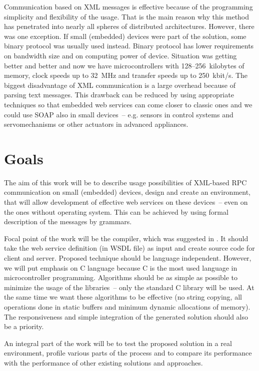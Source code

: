 \documentclass[12pt,notitlepage]{report}
\begin{document}
Communication based on XML messages is effective because of the programming simplicity and flexibility of the usage. That is the main reason why this method has penetrated into nearly all spheres of distributed architectures. However, there was one exception. If small (embedded) devices were part of the solution, some binary protocol was usually used instead. Binary protocol has lower requirements on bandwidth size and on computing power of device. Situation was getting better and better and now we have microcontrollers with 128--256~kilobytes of memory, clock speeds up to 32~MHz and transfer speeds up to 250~kbit/s. The biggest disadvantage of XML communication is a large overhead because of parsing text messages. This drawback can be reduced by using appropriate techniques so that embedded web services can come closer to classic ones and we could use SOAP also in small devices~-- e.g. sensors in control systems and servomechanisms or other actuators in advanced appliances.

\section{Goals}
The aim of this work will be to describe usage possibilities of XML-based RPC communication on small (embedded) devices, design and create an environment, that will allow development of effective web services on these devices~-- even on the ones without operating system. This can be achieved by using formal description of the messages by grammars.

Focal point of the work will be the compiler, which was suggested in \cite{janecek}. It should take the web service definition (in WSDL file) as input and create source code for client and server. Proposed technique should be language independent. However, we will put emphasis on C language because C is the most used language in microcontroller programming. Algorithms should be as simple as possible to minimize the usage of the libraries~-- only the standard C library will be used. At the same time we want these algorithms to be effective (no string copying, all operations done in static buffers and minimum dynamic allocations of memory). The responsiveness and simple integration of the generated solution should also be a priority.

An integral part of the work will be to test the proposed solution in a real environment, profile various parts of the process and to compare its performance with the performance of other existing solutions and approaches.
\end{document}
